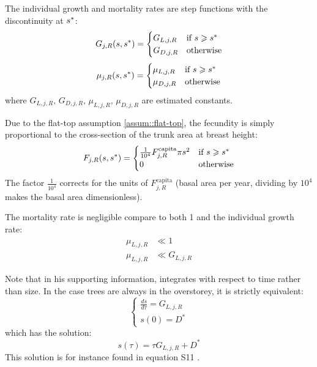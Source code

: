 \begin{refsection}
\begin{assum}
	The individual growth and mortality rates are step functions with the discontinuity at $ {s}^{*} $:
	\[
		G_{j, R}(s, {s}^{*}) =
		\begin{cases}
			G_{L, j, R} & \text{if } s \geqslant {s}^{*} \\
			G_{D, j, R} & \text{otherwise}
		\end{cases}
	\]
	\[
	\mu_{j, R}(s, {s}^{*}) =
		\begin{cases}
			\mu_{L, j, R} & \text{if } s \geqslant {s}^{*} \\
			\mu_{D, j, R} & \text{otherwise}
		\end{cases}
	\]
	where $ G_{L, j, R}, \, G_{D, j, R}, \, \mu_{L, j, R}, \, \mu_{D, j, R} $ are estimated constants.
\end{assum}

\begin{assum}
	Due to the flat-top assumption \ref{assum::flat-top}, the fecundity is simply proportional to the cross-section of the trunk area at breast height:
	\[
		F_{j, R} (s, {s}^{*}) =
		\begin{cases}
			\frac{1}{10^4} F_{j, R}^{\text{capita}} \pi s^2 & \text{if } s \geqslant {s}^{*} \\
			0 & \text{otherwise}
		\end{cases}
	\]
	The factor $ \frac{1}{10^4} $ corrects for the units of $ F_{j, R}^{\text{capita}} $ (basal area per year, dividing by $ 10^4 $ makes the basal area dimensionless).
\end{assum}

\begin{assum} \label{assum::negligible}
	The mortality rate is negligible compare to both 1 and the individual growth rate:
	\begin{align}
		\mu_{L, j, R} &\ll 1 \\
		\mu_{L, j, R} &\ll G_{L, j, R}
	\end{align}
\end{assum}

Note that in his supporting information, \citet{Purves2009} integrates with respect to time rather than size. In the case trees are always in the overstorey, it is strictly equivalent:
\[
	\begin{cases}
		\frac{ds}{d \tau} = G_{L, j, R} \\
		s(0) = D^{*}
	\end{cases}
\]
which has the solution:
\[
	s(\tau) = \tau G_{L, j, R} + D^{*}
\]
This solution is for instance found in equation S11 \citep{Purves2009}.


\end{refsection}
